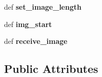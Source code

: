 \begin{DoxyCompactItemize}
\item 
\hypertarget{classbr__cam_1_1RovCam_ac66c169e0c5030a7b950a88c0ad1fdb8}{def {\bfseries set\-\_\-image\-\_\-length}}\label{classbr__cam_1_1RovCam_ac66c169e0c5030a7b950a88c0ad1fdb8}

\item 
\hypertarget{classbr__cam_1_1RovCam_a23d8c29a7fc5ac692c085cf228f6917d}{def {\bfseries img\-\_\-start}}\label{classbr__cam_1_1RovCam_a23d8c29a7fc5ac692c085cf228f6917d}

\item 
\hypertarget{classbr__cam_1_1RovCam_a51a22e839f5fcbae92a3f3437ea07747}{def {\bfseries receive\-\_\-image}}\label{classbr__cam_1_1RovCam_a51a22e839f5fcbae92a3f3437ea07747}

\end{DoxyCompactItemize}
\subsection*{Public Attributes}
